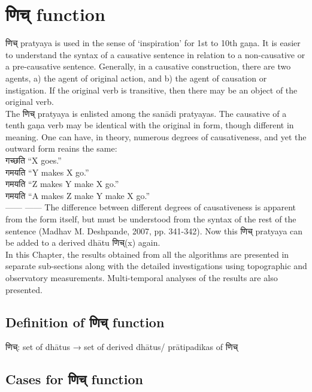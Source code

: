 
\section{\texthindi{णिच्} function}
णिच् pratyaya is used in the sense of ‘inspiration’ for 1st to 10th gaṇa. It is easier to understand the syntax of a causative sentence in relation to a non-causative or a pre-causative sentence. Generally, in a causative construction, there are two agents, a) the agent of original action, and b) the agent of causation or instigation. If the original verb is transitive, then there may be an object of the original verb.\\
The णिच् pratyaya is enlisted among the sanādi pratyayas. The causative of a tenth gaṇa verb may be identical with the original in form, though different in meaning. One can have, in theory, numerous degrees of causativeness, and yet the outward form reains the same:\\
\texthindi{गच्छति }    “X goes.”\\
\texthindi{गमयति }  “Y makes X go.”\\ 
\texthindi{गमयति} “Z makes Y make X go.”\\ 
\texthindi{गमयति} “A makes Z make Y make X go.”\\ 
------
------
The difference between different degrees of causativeness is apparent from the form itself, but must be understood from the syntax of the rest of the sentence (Madhav M. Deshpande, 2007, pp. 341-342). Now this \texthindi{णिच्} pratyaya can be added to a derived dhātu \texthindi{णिच्}(x) again.\\

In this Chapter, the results obtained from all the algorithms are presented in separate sub-sections along with the detailed investigations using topographic and observatory measurements. Multi-temporal analyses of the results are also presented. 

\subsection{Definition of \texthindi{णिच्} function}
\texthindi{णिच्}: set of dhātus → set of derived dhātus/ prātipadikas of \texthindi{णिच्}

\subsection{Cases for \texthindi{णिच्} function}

